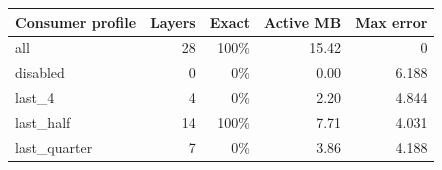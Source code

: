 \begin{tabular}{lrrrr}
\toprule
Consumer profile & Layers & Exact & Active MB & Max error \\
\midrule
all & 28 & 100\% & 15.42 & 0 \\
disabled & 0 & 0\% & 0.00 & 6.188 \\
last\_4 & 4 & 0\% & 2.20 & 4.844 \\
last\_half & 14 & 100\% & 7.71 & 4.031 \\
last\_quarter & 7 & 0\% & 3.86 & 4.188 \\
\bottomrule
\end{tabular}
